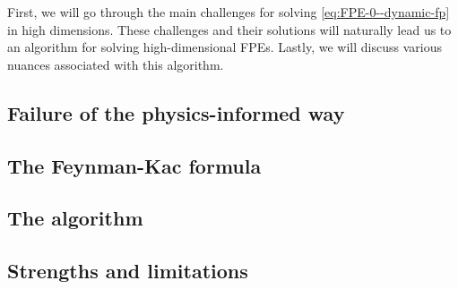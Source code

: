 First, we will go through the main challenges for solving \eqref{eq:FPE-0--dynamic-fp} in high dimensions. These challenges and their solutions will naturally lead us to an algorithm for solving high-dimensional FPEs. Lastly, we will discuss various nuances associated with this algorithm.

\subsection{Failure of the physics-informed way}

\label{ssec-failure--dynamic-fp}

\subsection{The Feynman-Kac formula}

\label{ssec-Feynman-Kac--dynamic-fp}

\subsection{The algorithm}

\label{ssec-algo--dynamic-fp}


\subsection{Strengths and limitations}

\label{ssec-limit--dynamic-fp}